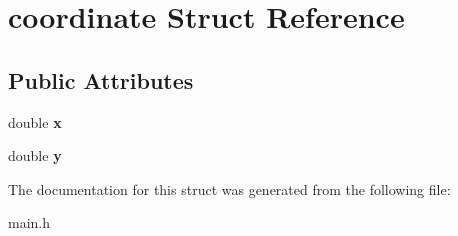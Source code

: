 \hypertarget{structcoordinate}{}\section{coordinate Struct Reference}
\label{structcoordinate}
\subsection*{Public Attributes}
\begin{DoxyCompactItemize}
\item 
\mbox{\label{structcoordinate_a3a164e660f2488a90d90f349d3b02010}} 
double {\bfseries x}
\item 
\mbox{\label{structcoordinate_a11b4100f0f7449334bd3957db9be03cc}} 
double {\bfseries y}
\end{DoxyCompactItemize}


The documentation for this struct was generated from the following file\+:\begin{DoxyCompactItemize}
\item 
main.\+h\end{DoxyCompactItemize}
